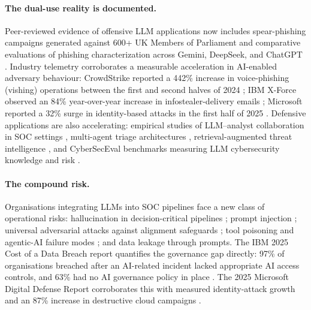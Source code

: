\documentclass[preprint,12pt,authoryear]{elsarticle}
\begin{document}
\paragraph{The dual-use reality is documented.} Peer-reviewed evidence of offensive LLM applications now includes spear-phishing campaigns generated against 600+ UK Members of Parliament \citep{hazell2023spear} and comparative evaluations of phishing characterization across Gemini, DeepSeek, and ChatGPT \citep{sbseg2024phishing}. Industry telemetry corroborates a measurable acceleration in AI-enabled adversary behaviour: CrowdStrike reported a 442\% increase in voice-phishing (vishing) operations between the first and second halves of 2024 \citep{crowdstrike2025}; IBM X-Force observed an 84\% year-over-year increase in infostealer-delivery emails \citep{xforce2025}; Microsoft reported a 32\% surge in identity-based attacks in the first half of 2025 \citep{mddr2025}. Defensive applications are also accelerating: empirical studies of LLM--analyst collaboration in SOC settings \citep{llmsoc2025}, multi-agent triage architectures \citep{cortex2025}, retrieval-augmented threat intelligence \citep{techniquerag2025,fayyazi2024llm}, and CyberSecEval benchmarks measuring LLM cybersecurity knowledge and risk \citep{bhatt2023cyberseceval,bhatt2024cyberseceval2,wan2024cyberseceval3}.

\paragraph{The compound risk.} Organisations integrating LLMs into SOC pipelines face a new class of operational risks: hallucination in decision-critical pipelines \citep{ji2023hallucination,manakul2023selfcheckgpt}; prompt injection \citep{greshake2023indirect,liu2024formalizing}; universal adversarial attacks against alignment safeguards \citep{zou2023universal}; tool poisoning and agentic-AI failure modes \citep{owasp2025agentic,owasp2025agenticthreats}; and data leakage through prompts. The IBM 2025 Cost of a Data Breach report quantifies the governance gap directly: 97\% of organisations breached after an AI-related incident lacked appropriate AI access controls, and 63\% had no AI governance policy in place \citep{ibm2025costbreach}. The 2025 Microsoft Digital Defense Report corroborates this with measured identity-attack growth and an 87\% increase in destructive cloud campaigns \citep{mddr2025}.
\end{document}
